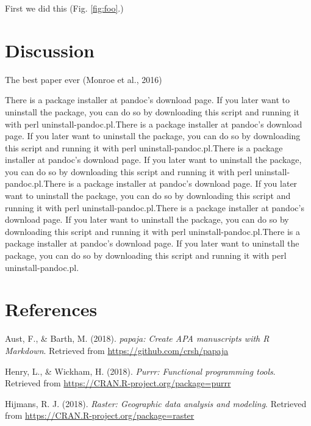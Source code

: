 \documentclass[man,floatsintext]{apa6}
\begin{document}
First we did this (Fig. \ref{fig:foo}.)

\hypertarget{discussion}{%
\section{Discussion}\label{discussion}}

The best paper ever (Monroe et al., 2016)

There is a package installer at pandoc's download page. If you later
want to uninstall the package, you can do so by downloading this script
and running it with perl uninstall-pandoc.pl.There is a package
installer at pandoc's download page. If you later want to uninstall the
package, you can do so by downloading this script and running it with
perl uninstall-pandoc.pl.There is a package installer at pandoc's
download page. If you later want to uninstall the package, you can do so
by downloading this script and running it with perl
uninstall-pandoc.pl.There is a package installer at pandoc's download
page. If you later want to uninstall the package, you can do so by
downloading this script and running it with perl
uninstall-pandoc.pl.There is a package installer at pandoc's download
page. If you later want to uninstall the package, you can do so by
downloading this script and running it with perl
uninstall-pandoc.pl.There is a package installer at pandoc's download
page. If you later want to uninstall the package, you can do so by
downloading this script and running it with perl uninstall-pandoc.pl.

\newpage

\hypertarget{references}{%
\section{References}\label{references}}

\begingroup
\setlength{\parindent}{-0.5in}
\setlength{\leftskip}{0.5in}

\hypertarget{refs}{}
\leavevmode\hypertarget{ref-R-papaja}{}%
Aust, F., \& Barth, M. (2018). \emph{papaja: Create APA manuscripts with
R Markdown}. Retrieved from \url{https://github.com/crsh/papaja}

\leavevmode\hypertarget{ref-R-purrr}{}%
Henry, L., \& Wickham, H. (2018). \emph{Purrr: Functional programming
tools}. Retrieved from \url{https://CRAN.R-project.org/package=purrr}

\leavevmode\hypertarget{ref-R-raster}{}%
Hijmans, R. J. (2018). \emph{Raster: Geographic data analysis and
modeling}. Retrieved from
\url{https://CRAN.R-project.org/package=raster}
\end{document}
